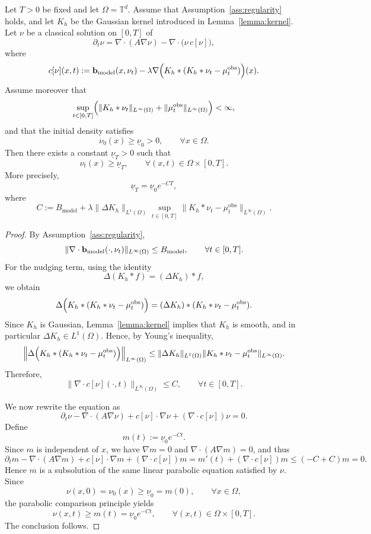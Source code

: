 \begin{proposition}
\label{prop:positivity}
Let $T>0$ be fixed and let $\Omega=\mathbb T^d$. Assume that
Assumption~\ref{ass:regularity} holds, and let $K_h$ be the Gaussian kernel
introduced in Lemma~\ref{lemma:kernel}. Let $\nu$ be a classical
solution on $[0,T]$ of
\[
\partial_t \nu
= \nabla\cdot(A\nabla \nu)-\nabla\cdot\bigl(\nu\,c[\nu]\bigr),
\]
where
\[
c[\nu](x,t)
:= \mathbf{b}_{\mathrm{model}}(x,\nu_t)
-\lambda \nabla\Bigl(K_h*(K_h*\nu_t-\mu_t^{\mathrm{obs}})\Bigr)(x).
\]
Assume moreover that
\[
\sup_{t\in[0,T]}
\Bigl(
\|K_h*\nu_t\|_{L^\infty(\Omega)}
+\|\mu_t^{\mathrm{obs}}\|_{L^\infty(\Omega)}
\Bigr)
<\infty,
\]
and that the initial density satisfies
\[
\nu_0(x)\ge \underline\nu_0>0,
\qquad \forall x\in\Omega.
\]
Then there exists a constant $\underline\nu_T>0$ such that
\[
\nu_t(x)\ge \underline\nu_T,
\qquad \forall (x,t)\in\Omega\times[0,T].
\]
More precisely,
\[
\underline\nu_T=\underline\nu_0 e^{-CT},
\]
where
\[
C:=B_{\mathrm{model}}
+\lambda \|\Delta K_h\|_{L^1(\Omega)}
\sup_{t\in[0,T]}
\|K_h*\nu_t-\mu_t^{\mathrm{obs}}\|_{L^\infty(\Omega)}.
\]
\end{proposition}

\begin{proof}
By Assumption~\ref{ass:regularity},
\[
\|\nabla\cdot \mathbf{b}_{\mathrm{model}}(\cdot,\nu_t)\|_{L^\infty(\Omega)}
\le B_{\mathrm{model}},
\qquad \forall t\in[0,T].
\]
For the nudging term, using the identity
\[
\Delta(K_h*f)=(\Delta K_h)*f,
\]
we obtain
\[
\Delta\Bigl(K_h*(K_h*\nu_t-\mu_t^{\mathrm{obs}})\Bigr)
=(\Delta K_h)*(K_h*\nu_t-\mu_t^{\mathrm{obs}}).
\]
Since $K_h$ is Gaussian, Lemma~\ref{lemma:kernel} implies that $K_h$
is smooth, and in particular $\Delta K_h\in L^1(\Omega)$. Hence, by Young's
inequality,
\[
\Bigl\|\Delta\Bigl(K_h*(K_h*\nu_t-\mu_t^{\mathrm{obs}})\Bigr)\Bigr\|_{L^\infty(\Omega)}
\le
\|\Delta K_h\|_{L^1(\Omega)}
\|K_h*\nu_t-\mu_t^{\mathrm{obs}}\|_{L^\infty(\Omega)}.
\]
Therefore,
\[
\|\nabla\cdot c[\nu](\cdot,t)\|_{L^\infty(\Omega)}
\le C,
\qquad \forall t\in[0,T].
\]

We now rewrite the equation as
\[
\partial_t \nu-\nabla\cdot(A\nabla\nu)
+c[\nu]\cdot\nabla\nu+(\nabla\cdot c[\nu])\nu=0.
\]
Define
\[
m(t):=\underline\nu_0 e^{-Ct}.
\]
Since $m$ is independent of $x$, we have $\nabla m=0$ and
$\nabla\cdot(A\nabla m)=0$, and thus
\[
\partial_t m-\nabla\cdot(A\nabla m)+c[\nu]\cdot\nabla m+(\nabla\cdot c[\nu])m
= m'(t)+(\nabla\cdot c[\nu])m
\le (-C+C)m=0.
\]
Hence $m$ is a subsolution of the same linear parabolic equation satisfied by
$\nu$. Since
\[
\nu(x,0)=\nu_0(x)\ge \underline\nu_0=m(0),
\qquad \forall x\in\Omega,
\]
the parabolic comparison principle yields
\[
\nu(x,t)\ge m(t)=\underline\nu_0 e^{-Ct},
\qquad \forall (x,t)\in\Omega\times[0,T].
\]
The conclusion follows.
\end{proof}




